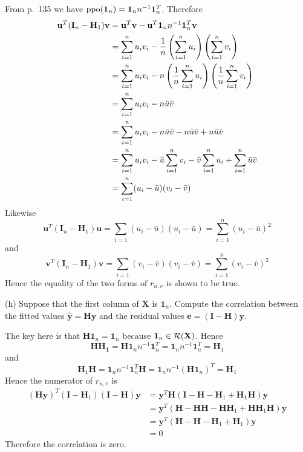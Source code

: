 \bigskip
\noindent
From p.\ 135 we have
$\mathop{\rm ppo}(\mathbf 1_n)=\mathbf 1_nn^{-1}\mathbf 1_n^T$.
Therefore
\begin{align*}
\mathbf u^T(\mathbf I_n-\mathbf H_1)\mathbf v
&=\mathbf u^T\mathbf v-\mathbf u^T\mathbf 1_nn^{-1}\mathbf 1_n^T\mathbf v\\
&=\sum_{i=1}^nu_iv_i-{1\over n}
\left(\sum_{i=1}^n u_i\right)\left(\sum_{i=1}^nv_i\right)\\
&=\sum_{i=1}^nu_iv_i-n
\left({1\over n}\sum_{i=1}^n u_i\right)
\left({1\over n}\sum_{i=1}^nv_i\right)\\
&=\sum_{i=1}^nu_iv_i-n\bar u\bar v\\
&=\sum_{i=1}^nu_iv_i-n\bar u\bar v-n\bar u\bar v+n\bar u\bar v\\
&=\sum_{i=1}^nu_iv_i
-\bar u\sum_{i=1}^n v_i
-\bar v\sum_{i=1}^n u_i
+\sum_{i=1}^n\bar u\bar v\\
&=\sum_{i=1}^n(u_i-\bar u)(v_i-\bar v)
\end{align*}
Likewise
\[
\mathbf u^T(\mathbf I_n-\mathbf H_1)\mathbf u
=\sum_{i=1}(u_i-\bar u)(u_i-\bar u)=\sum_{i=1}^n(u_i-\bar u)^2
\]
and
\[
\mathbf v^T(\mathbf I_n-\mathbf H_1)\mathbf v
=\sum_{i=1}(v_i-\bar v)(v_i-\bar v)=\sum_{i=1}^n(v_i-\bar v)^2
\]
Hence the equality of the two forms of $r_{u,v}$ is shown to be true.

\bigskip
\noindent
(h) Suppose that the first column of $\mathbf X$ is $\mathbf 1_n$.
Compute the correlation between the fitted values
$\mathbf{\hat y}=\mathbf{Hy}$ and the residual values
$\mathbf e=(\mathbf I-\mathbf H)\mathbf y$.

\bigskip
\noindent
The key here is that $\mathbf H\mathbf 1_n=\mathbf 1_n$ because
$\mathbf 1_n\in{\cal R}(\mathbf X)$.
Hence
\[
\mathbf{HH_1}
=\mathbf{H1}_nn^{-1}\mathbf 1_n^T
=\mathbf 1_nn^{-1}\mathbf 1_n^T=\mathbf H_1
\]
and
\[
\mathbf H_1\mathbf H
=\mathbf 1_nn^{-1}\mathbf 1_n^T\mathbf H
=\mathbf 1_nn^{-1}(\mathbf H\mathbf 1_n)^T=\mathbf H_1
\]
Hence the numerator of $r_{u,v}$ is
\begin{align*}
(\mathbf{Hy})^T(\mathbf I-\mathbf H_1)
(\mathbf I-\mathbf H)\mathbf y
&=\mathbf y^T\mathbf H(\mathbf I-\mathbf H-\mathbf H_1+\mathbf{H_1H})
\mathbf y\\
&=\mathbf y^T
(\mathbf H-\mathbf{HH}-\mathbf{HH}_1+\mathbf{HH}_1\mathbf H)
\mathbf y\\
&=\mathbf y^T
(\mathbf H-\mathbf H-\mathbf  H_1+\mathbf H_1)
\mathbf y\\
&=0
\end{align*}
Therefore the correlation is zero.
